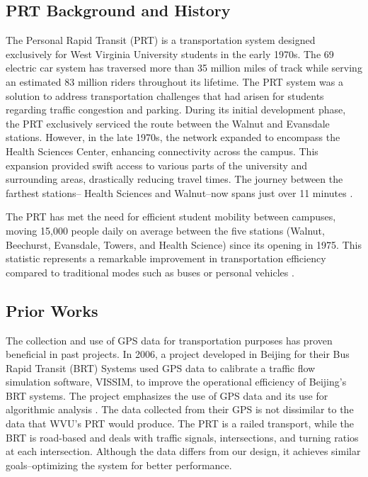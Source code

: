 \subsection{PRT Background and History}
The Personal Rapid Transit (PRT) is a transportation system designed exclusively for West Virginia University students in the early 1970s. The 69 electric car system has traversed more than 35 million miles of track while serving an estimated 83 million riders throughout its lifetime. The PRT system was a solution to address transportation challenges that had arisen for students regarding traffic congestion and parking. During its initial development phase, the PRT exclusively serviced the route between the Walnut and Evansdale stations. However, in the late 1970s, the network expanded to encompass the Health Sciences Center, enhancing connectivity across the campus. This expansion provided swift access to various parts of the university and surrounding areas, drastically reducing travel times. The journey between the farthest stations– Health Sciences and Walnut–now spans just over 11 minutes \cite{about-prt}.

The PRT has met the need for efficient student mobility between campuses, moving 15,000 people daily on average between the five stations (Walnut, Beechurst, Evansdale, Towers, and Health Science) since its opening in 1975. This statistic represents a remarkable improvement in transportation efficiency compared to traditional modes such as buses or personal vehicles \cite{about-prt}.

\subsection{Prior Works}
The collection and use of GPS data for transportation purposes has proven beneficial in past projects. In 2006, a project developed in Beijing for their Bus Rapid Transit (BRT) Systems used GPS data to calibrate a traffic flow simulation software, VISSIM, to improve the operational efficiency of Beijing’s BRT systems. The project emphasizes the use of GPS data and its use for algorithmic analysis \cite{Yu_Yu_Chen_Wan_Guo_2006}. The data collected from their GPS is not dissimilar to the data that WVU’s PRT would produce. The PRT is a railed transport, while the BRT is road-based and deals with traffic signals, intersections, and turning ratios at each intersection. Although the data differs from our design, it achieves similar goals–optimizing the system for better performance.
	

